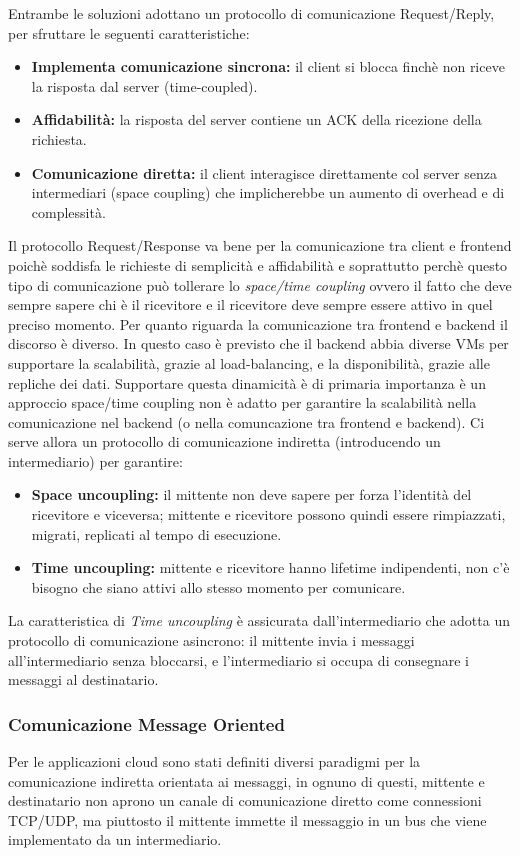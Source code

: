 \documentclass{article}
\begin{document}
Entrambe le soluzioni adottano un protocollo di comunicazione Request/Reply, per sfruttare le seguenti caratteristiche:
\begin{itemize}
    \item \textbf{Implementa comunicazione sincrona:} il client si blocca finchè non riceve la risposta dal server (time-coupled).
    \item \textbf{Affidabilità:} la risposta del server contiene un ACK della ricezione della richiesta.
    \item \textbf{Comunicazione diretta:} il client interagisce direttamente col server senza intermediari (space coupling) che implicherebbe un aumento di overhead e di complessità.
\end{itemize}
Il protocollo Request/Response va bene per la comunicazione tra client e frontend poichè soddisfa le richieste di semplicità e affidabilità e soprattutto perchè questo tipo di comunicazione può tollerare lo \textit{space/time coupling} ovvero il fatto che deve sempre sapere chi è il ricevitore e il ricevitore deve sempre essere attivo in quel preciso momento.
Per quanto riguarda la comunicazione tra frontend e backend il discorso è diverso. In questo caso è previsto che il backend abbia diverse VMs per supportare la scalabilità, grazie al load-balancing, e la disponibilità, grazie alle repliche dei dati.
Supportare questa dinamicità è di primaria importanza è un approccio space/time coupling non è adatto per garantire la scalabilità nella comunicazione nel backend (o nella comuncazione tra frontend e backend).
Ci serve allora un protocollo di comunicazione indiretta (introducendo un intermediario) per garantire:
\begin{itemize}
    \item \textbf{Space uncoupling:} il mittente non deve sapere per forza l'identità del ricevitore e viceversa; mittente e ricevitore possono quindi essere rimpiazzati, migrati, replicati al tempo di esecuzione.
    \item \textbf{Time uncoupling:} mittente e ricevitore hanno lifetime indipendenti, non c'è bisogno che siano attivi allo stesso momento per comunicare.
\end{itemize}
La caratteristica di \textit{Time uncoupling} è assicurata dall'intermediario che adotta un protocollo di comunicazione asincrono: il mittente invia i messaggi all'intermediario senza bloccarsi, e l'intermediario si occupa di consegnare i messaggi al destinatario.
\subsubsection{Comunicazione Message Oriented}
Per le applicazioni cloud sono stati definiti diversi paradigmi per la comunicazione indiretta orientata ai messaggi, in ognuno di questi, mittente e destinatario non aprono un canale di comunicazione diretto come connessioni TCP/UDP, ma piuttosto il mittente immette il messaggio in un bus che viene implementato da un intermediario.
\end{document}
